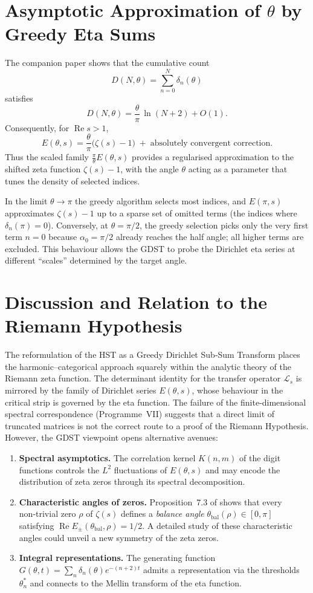 \documentclass[11pt,a4paper]{article}
\begin{document}
\section{Asymptotic Approximation of \(\theta\) by Greedy Eta Sums}
The companion paper \cite{Geere2026GHeta} shows that the cumulative count
\[
D(N,\theta) = \sum_{n=0}^{N} \delta_n(\theta)
\]
satisfies
\[
D(N,\theta) = \frac{\theta}{\pi}\,\ln(N+2) + O(1).
\]
Consequently, for \(\operatorname{Re}s>1\),
\[
E(\theta,s) = \frac{\theta}{\pi}\bigl(\zeta(s)-1\bigr) \;+\; \text{absolutely convergent correction}.
\]
Thus the scaled family \(\frac{\pi}{\theta}E(\theta,s)\) provides a regularised approximation to the shifted zeta function \(\zeta(s)-1\), with the angle \(\theta\) acting as a parameter that tunes the density of selected indices.

In the limit \(\theta\to\pi\) the greedy algorithm selects most indices, and \(E(\pi,s)\) approximates \(\zeta(s)-1\) up to a sparse set of omitted terms (the indices where \(\delta_n(\pi)=0\)).  Conversely, at \(\theta=\pi/2\), the greedy selection picks only the very first term \(n=0\) because \(\alpha_0=\pi/2\) already reaches the half angle; all higher terms are excluded.  This behaviour allows the GDST to probe the Dirichlet eta series at different “scales” determined by the target angle.

\section{Discussion and Relation to the Riemann Hypothesis}
The reformulation of the HST as a Greedy Dirichlet Sub‑Sum Transform places the harmonic–categorical approach squarely within the analytic theory of the Riemann zeta function.  The determinant identity for the transfer operator \(\mathcal{L}_s\) is mirrored by the family of Dirichlet series \(E(\theta,s)\), whose behaviour in the critical strip is governed by the eta function.  The failure of the finite‑dimensional spectral correspondence (Programme~VII) suggests that a direct limit of truncated matrices is not the correct route to a proof of the Riemann Hypothesis.  However, the GDST viewpoint opens alternative avenues:

\begin{enumerate}
\item \textbf{Spectral asymptotics.}  The correlation kernel \(K(n,m)\) of the digit functions controls the \(L^2\) fluctuations of \(E(\theta,s)\) and may encode the distribution of zeta zeros through its spectral decomposition.
\item \textbf{Characteristic angles of zeros.}  Proposition~7.3 of \cite{Geere2026GHeta} shows that every non‑trivial zero \(\rho\) of \(\zeta(s)\) defines a \emph{balance angle} \(\theta_{\text{bal}}(\rho)\in[0,\pi]\) satisfying \(\operatorname{Re}E_\pm(\theta_{\text{bal}},\rho)=1/2\).  A detailed study of these characteristic angles could unveil a new symmetry of the zeta zeros.
\item \textbf{Integral representations.}  The generating function \(G(\theta,t)=\sum_n\delta_n(\theta)e^{-(n+2)t}\) admits a representation via the thresholds \(\theta_n^*\) and connects to the Mellin transform of the eta function.
\end{enumerate}
\end{document}
